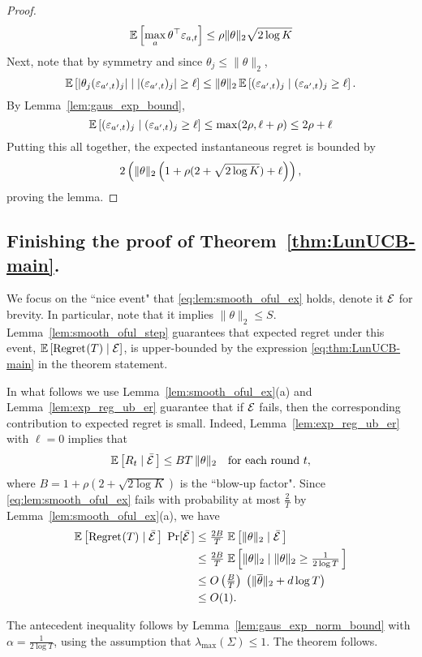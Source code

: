 \begin{proof}
\[    \operatorname{\mathbb{E}} \left[\max_a \theta^{\top} \varepsilon_{a,t}\right] \le \rho
    \|\theta\|_2 \sqrt{2 \log K}
  \]
  Next, note that by symmetry and since $\theta_j \le \|\theta\|_2$,
  \[
    \operatorname{\mathbb{E}} \left[|\theta_j (\varepsilon_{a',t})_j|\;|\;
    |(\varepsilon_{a',t})_j| \ge \ell\right]
    \le \|\theta\|_2 \operatorname{\mathbb{E}} \left[(\varepsilon_{a',t})_j\;|\;
    (\varepsilon_{a',t})_j \ge \ell\right].
  \]
  By Lemma~\ref{lem:gaus_exp_bound},
  \[
    \operatorname{\mathbb{E}} \left[(\varepsilon_{a',t})_j\;|\;
    (\varepsilon_{a',t})_j \ge \ell\right] \le \max(2\rho, \ell + \rho)
    \le 2\rho + \ell
  \]
  Putting this all together, the expected instantaneous regret is bounded by
  \[
    2\left(\|\theta\|_2\left(1 + \rho(2 + \sqrt{2 \log K}) + \ell\right)\right),
  \]
  proving the lemma.
\end{proof}

\subsection{Finishing the proof of Theorem~\ref{thm:LunUCB-main}.}
\label{app:linucb-coda}

We focus on the ``nice event" that \eqref{eq:lem:smooth_oful_ex} holds, denote it
$ \mathcal{E}$ for brevity. In particular, note that it implies $\|\theta\|_2\leq S$. Lemma~\ref{lem:smooth_oful_step} guarantees that expected regret under this event,
    $\mathbb{E}\left[\text{Regret}^{}(T) \;|\; \mathcal{E}\right]$, is upper-bounded by
the expression \eqref{eq:thm:LunUCB-main} in the theorem statement.


In what follows we use Lemma~\ref{lem:smooth_oful_ex}(a) and Lemma~\ref{lem:exp_reg_ub_er} guarantee that if $\mathcal{E}$ fails, then the
corresponding contribution to expected regret is small. Indeed, Lemma~\ref{lem:exp_reg_ub_er} with $\ell = 0$ implies that
\begin{align*}
    \mathbb{E}\left[R_t \;|\; \bar{\mathcal{E}}\,\right]
       \leq BT\,\|\theta\|_2 \quad\text{for each round $t$},
\end{align*}
where $B= 1 + \rho(2 + \sqrt{2 \log K})$ is the ``blow-up factor". Since  \eqref{eq:lem:smooth_oful_ex} fails with probability at most $\tfrac{2}{T}$
by Lemma~\ref{lem:smooth_oful_ex}(a), we have
\begin{align*}
\mathbb{E}\left[\text{Regret}^{}(T) \;|\; \bar{\mathcal{E}}\,\right] \;\Pr[\bar{\mathcal{E}}\,]
    & \leq \tfrac{2B}{T}\; \mathbb{E}\left[ \|\theta\|_2 \;|\; \bar{\mathcal{E}}\,\right] \\
    & \leq \tfrac{2B}{T}\;
        \mathbb{E}\left[ \|\theta\|_2 \;|\; \|\theta\|_2 \geq \tfrac{1}{2\log T}\,\right] \\
    &\leq O\left(\tfrac{B}{T}\right)\; \left(\|\overline \theta\|_2 + d\log T\right) \\
    &\leq O(1).
\end{align*}

The antecedent inequality follows by Lemma~\ref{lem:gaus_exp_norm_bound} with
            $\alpha =\tfrac{1}{2\log T} $,
using the assumption that $\lambda_{\max}(\Sigma)\leq 1$. The theorem follows.
